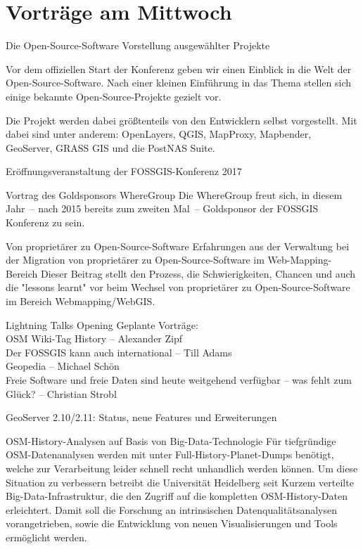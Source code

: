 \newpage
\section*{Vorträge am Mittwoch}
\label{mittwoch}
\renewcommand{\konferenztag}{\mittwoch}
%
{Die Open-Source-Software}%
{Vorstellung ausgewählter Projekte}%
{Vor dem offiziellen Start der Konferenz geben wir einen Einblick in die Welt der Open-Source-Software. Nach einer kleinen Einführung in das Thema stellen sich einige bekannte Open-Source-Projekte gezielt vor.

Die Projekt werden dabei größtenteils von den Entwicklern selbst vorgestellt. Mit dabei sind unter anderem:
OpenLayers, QGIS, MapProxy, Mapbender, GeoServer, GRASS GIS und die PostNAS Suite.}

%
%
{Eröffnungsveranstaltung der FOSSGIS-Konferenz 2017}%
{}%
{}

%
%
{Vortrag des Goldsponsors WhereGroup}%
{}%
{Die WhereGroup freut sich, in diesem Jahr~-- nach 2015 bereits zum zweiten Mal~--
Goldsponsor der FOSSGIS Konferenz zu sein.}

%
{Von proprietärer zu Open-Source-Software}%
{Erfahrungen aus der Verwaltung bei der Migration von proprietärer zu Open-Source-Software im
Web-Mapping-Bereich}%
{Dieser Beitrag stellt den Prozess, die Schwierigkeiten, Chancen und auch die "lessons learnt" vor
beim Wechsel von proprietärer zu Open-Source-Software im Bereich Webmapping/WebGIS.}

%
\abstractZehn{}%
{Lightning Talks Opening}%
{}%
{Geplante Vorträge:\\
OSM Wiki-Tag History -- Alexander Zipf\\
Der FOSSGIS kann auch international -- Till Adams\\
Geopedia -- Michael Schön\\
Freie Software und freie Daten sind heute weitgehend verfügbar -- was fehlt zum Glück? -- Christian
Strobl}

%
{GeoServer 2.10/2.11: Status, neue Features und Erweiterungen}%
{}%
{%
}

%
{OSM-History-Analysen auf Basis von Big-Data-Technologie}%
{}%
{Für tiefgründige OSM-Datenanalysen werden mit unter Full-History-Planet-Dumps benötigt, welche zur
Verarbeitung leider schnell recht unhandlich werden können. Um diese Situation zu verbessern
betreibt die Universität Heidelberg seit Kurzem verteilte Big-Data-Infrastruktur, die den Zugriff
auf die kompletten OSM-History-Daten erleichtert. Damit soll die Forschung an intrinsischen
Datenqualitätsanalysen vorangetrieben, sowie die Entwicklung von neuen Visualisierungen und Tools
ermöglicht werden.}%

